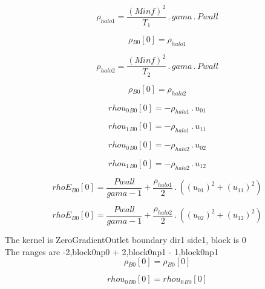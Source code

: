 \documentclass{article}
\begin{document}
\begin{dmath}\rho_{halo 1} = \frac{\left(Minf \right)^{2}}{T_{1}} \,.\, gama \,.\, Pwall\end{dmath}

\begin{dmath}{\rho{_{B0}}}[{0}] = \rho_{halo 1}\end{dmath}

\begin{dmath}\rho_{halo 2} = \frac{\left(Minf \right)^{2}}{T_{2}} \,.\, gama \,.\, Pwall\end{dmath}

\begin{dmath}{\rho{_{B0}}}[{0}] = \rho_{halo 2}\end{dmath}

\begin{dmath}{rhou_{0}{_{B0}}}[{0}] = - \rho_{halo 1} \,.\, u_{01}\end{dmath}

\begin{dmath}{rhou_{1}{_{B0}}}[{0}] = - \rho_{halo 1} \,.\, u_{11}\end{dmath}

\begin{dmath}{rhou_{0}{_{B0}}}[{0}] = - \rho_{halo 2} \,.\, u_{02}\end{dmath}

\begin{dmath}{rhou_{1}{_{B0}}}[{0}] = - \rho_{halo 2} \,.\, u_{12}\end{dmath}

\begin{dmath}{rhoE{_{B0}}}[{0}] = \frac{Pwall}{gama - 1} + \frac{\rho_{halo 1}}{2} \,.\, \left(\left(u_{01} \right)^{2} + \left(u_{11} \right)^{2}\right)\end{dmath}

\begin{dmath}{rhoE{_{B0}}}[{0}] = \frac{Pwall}{gama - 1} + \frac{\rho_{halo 2}}{2} \,.\, \left(\left(u_{02} \right)^{2} + \left(u_{12} \right)^{2}\right)\end{dmath}

\noindent The kernel is ZeroGradientOutlet boundary dir1 side1, block is 0\\\noindent The ranges are -2,block0np0 + 2,block0np1 - 1,block0np1\\\begin{dmath}{\rho{_{B0}}}[{0}] = {\rho{_{B0}}}[{0}]\end{dmath}

\begin{dmath}{rhou_{0}{_{B0}}}[{0}] = {rhou_{0}{_{B0}}}[{0}]\end{dmath}
\end{document}
